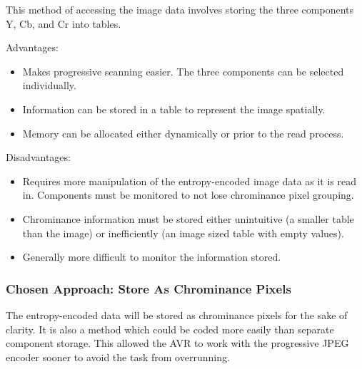 This method of accessing the image data involves 
storing the three components Y, Cb, and Cr into tables.

Advantages:
\begin{itemize}
	\item Makes progressive scanning easier. 
		The three components can be selected individually.
	\item Information can be stored in a table to 
		represent the image spatially.
	\item Memory can be allocated either 
		dynamically or prior to the read process.
\end{itemize}

Disadvantages:
\begin{itemize}
	\item Requires more manipulation of the 
		entropy-encoded image data as it is read in. 
		Components must be monitored to not 
		lose chrominance pixel grouping.
	\item Chrominance information must be stored either 
		unintuitive (a smaller table than the image) or 
		inefficiently (an image sized table with empty values).
	\item Generally more difficult to monitor the information stored.
\end{itemize}

\subsubsection{Chosen Approach: Store As Chrominance Pixels}

The entropy-encoded data will be stored as chrominance 
pixels for the sake of clarity. 
It is also a method which could be coded more easily 
than separate component storage. 
This allowed the AVR to work with the progressive 
JPEG encoder sooner to avoid the task from overrunning.